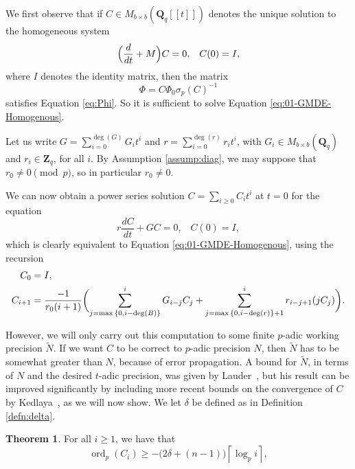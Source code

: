 \documentclass[a4paper,11pt]{article}
\numberwithin{equation}{section}
\providecommand{\ceil}[1]{\left\lceil#1\right\rceil}   %
\newcommand{\ZZ}{\mathbf{Z}} %
\newcommand{\QQ}{\mathbf{Q}} %
\DeclareMathOperator{\ord}{ord}          %
\theoremstyle{definition}
\newtheorem{thm}{Theorem}[section]
\begin{document}
We first observe that if $C \in M_{b \times b}(\QQ_q[[t]])$ denotes the unique solution to the 
homogeneous system
\begin{equation} \label{eq:01-GMDE-Homogenous}
\Bigl(\frac{d}{dt} + M\Bigr) C = 0, \; \; \; C(0)=I,
\end{equation}
where $I$ denotes the identity matrix, then the matrix
\begin{equation*}
\Phi = C \Phi_0 \sigma_p(C)^{-1}
\end{equation*}
satisfies Equation \eqref{eq:Phi}. So it is sufficient to solve Equation 
\eqref{eq:01-GMDE-Homogenous}.

Let us write $G = \sum_{i=0}^{\deg(G)} G_i t^i$ and $r= \sum_{i=0}^{\deg(r)} r_i t^i$,
with $G_i \in M_{b \times b}(\QQ_q)$ and $r_i \in \ZZ_q$, for all $i$. By Assumption 
\ref{assump:diag}, we may suppose that $r_0 \neq 0 \pmod{p}$, so in particular $r_0 \neq 0$.

We can now obtain a power series solution $C = \sum_{i \geq 0} C_i t^i$ at $t=0$ for 
the equation
\begin{equation*}
r \frac{dC}{dt} + G C = 0, \; \; \; C(0)=I,
\end{equation*}
which is clearly equivalent to Equation \eqref{eq:01-GMDE-Homogenous}, using the recursion 
\begin{align}
C_0 &= I, \notag \\ 
C_{i+1} &= \frac{-1}{r_0 (i+1)} \biggl(
    \sum_{j=\max{\{0,i-\deg(B)\}}}^i G_{i-j} C_j + 
    \sum_{j=\max{\{0,i-\deg(r)\}}+1}^i r_{i-j+1} (j C_j) \biggr). \label{eq:recursiondifeq}
\end{align}

However, we will only carry out this computation to some finite $p$-adic working precision $\tilde{N}$. If
we want $C$ to be correct to $p$-adic precision $N$, then $\tilde{N}$ has to be somewhat greater than $N$, 
because of error propagation. A bound for $\tilde{N}$, in terms of $N$ and the desired $t$-adic precision, 
was given by Lauder~\citep[Theorem~5.1]{Lauder2006}, but his result can be improved significantly by including 
more recent bounds on the convergence of $C$ by Kedlaya~\citep{Kedlaya2010}, as we will now show. We let
 $\delta$ be defined as in Definition \ref{defn:delta}. 

\begin{thm} \label{thm:valC}
For all $i \geq 1$, we have that
\begin{equation*}
\ord_p(C_i) \geq - \bigl(2 \delta + (n - 1)\bigr) \ceil{\log_p i},
\end{equation*}
\end{thm}
\end{document}
